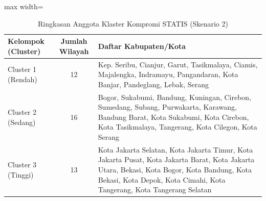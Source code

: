 \begin{table}[H]
\centering
\caption{Ringkasan Anggota Klaster Kompromi STATIS (Skenario 2)} \label{tab:app2compromclust}
\begin{adjustbox}{max width=\textwidth}
\begin{tabular}{|p{3cm}|c|p{10cm}|}
\hline
\textbf{Kelompok (Cluster)} & \textbf{Jumlah Wilayah} & \textbf{Daftar Kabupaten/Kota} \\
\hline
Cluster 1 (Rendah) & 12 & Kep. Seribu, Cianjur, Garut, Tasikmalaya, Ciamis, Majalengka, Indramayu, Pangandaran, Kota Banjar, Pandeglang, Lebak, Serang \\
\hline
Cluster 2 (Sedang) & 16 & Bogor, Sukabumi, Bandung, Kuningan, Cirebon, Sumedang, Subang, Purwakarta, Karawang, Bandung Barat, Kota Sukabumi, Kota Cirebon, Kota Tasikmalaya, Tangerang, Kota Cilegon, Kota Serang \\
\hline
Cluster 3 (Tinggi) & 13 & Kota Jakarta Selatan, Kota Jakarta Timur, Kota Jakarta Pusat, Kota Jakarta Barat, Kota Jakarta Utara, Bekasi, Kota Bogor, Kota Bandung, Kota Bekasi, Kota Depok, Kota Cimahi, Kota Tangerang, Kota Tangerang Selatan \\
\hline
\end{tabular}
\end{adjustbox}
\end{table}
